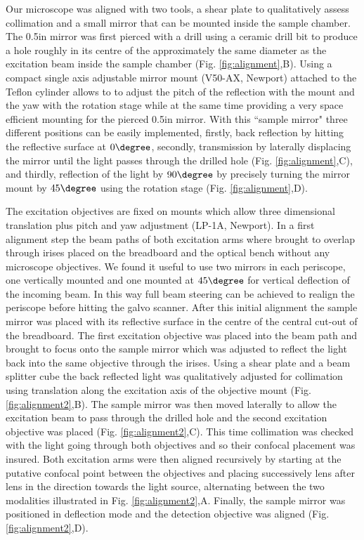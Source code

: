 \documentclass[12pt]{spieman}  %
\begin{document}
\begin{spacing}{2}
Our microscope was aligned with two tools, a shear plate to qualitatively assess collimation and a small mirror that can be mounted inside the sample chamber. The 0.5in mirror was first pierced with a drill using a ceramic drill bit to produce a hole roughly in its centre of the approximately the same diameter as the excitation beam inside the sample chamber (Fig. \ref{fig:alignment},B). Using a compact single axis adjustable mirror mount (V50-AX, Newport) attached to the Teflon cylinder allows to to adjust the pitch of the reflection with the mount and the yaw with the rotation stage while at the same time providing a very space efficient mounting for the pierced 0.5in mirror. With this ``sample mirror" three different positions can be easily implemented, firstly, back reflection by hitting the reflective surface at $0\degree$, secondly, transmission by laterally displacing the mirror until the light passes through the drilled hole (Fig. \ref{fig:alignment},C), and thirdly, reflection of the light by $90\degree$ by precisely turning the mirror mount by $45\degree$ using the rotation stage (Fig. \ref{fig:alignment},D). 

The excitation objectives are fixed on mounts which allow three dimensional translation plus pitch and yaw adjustment (LP-1A, Newport). In a first alignment step the beam paths of both excitation arms where brought to overlap through irises placed on the breadboard and the optical bench without any microscope objectives. We found it useful to use two mirrors in each periscope, one vertically mounted and one mounted at $45\degree$ for vertical deflection of the incoming beam. In this way full beam steering can be achieved to realign the periscope before hitting the galvo scanner. After this initial alignment the sample mirror was placed with its reflective surface in the centre of the central cut-out of the breadboard. The first excitation objective was placed into the beam path and brought to focus onto the sample mirror which was adjusted to reflect the light back into the same objective through the irises. Using a shear plate and a beam splitter cube the back reflected light was qualitatively adjusted for collimation using translation along the excitation axis of the objective mount (Fig. \ref{fig:alignment2},B). The sample mirror was then moved laterally to allow the excitation beam to pass through the drilled hole and the second excitation objective was placed (Fig. \ref{fig:alignment2},C). This time collimation was checked with the light going through both objectives and so their confocal placement was insured. Both excitation arms were then aligned recursively by starting at the putative confocal point between the objectives and placing successively lens after lens in the direction towards the light source, alternating between the two modalities illustrated in Fig. \ref{fig:alignment2},A. Finally, the sample mirror was positioned in deflection mode and the detection objective was aligned (Fig. \ref{fig:alignment2},D). 


\end{spacing}
\end{document}
